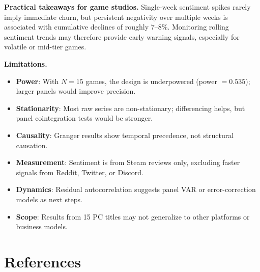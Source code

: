 \documentclass[11pt, letterpaper]{article}
\begin{document}
\medskip\noindent\textbf{Practical takeaways for game studios.}
Single-week sentiment spikes rarely imply immediate churn, but persistent negativity over multiple weeks is associated with cumulative declines of roughly 7--8\%.
Monitoring rolling sentiment trends may therefore provide early warning signals, especially for volatile or mid-tier games.

\medskip\noindent\textbf{Limitations.}
\begin{itemize}[nosep]
    \item \textbf{Power}: With $N = 15$ games, the design is underpowered (power $= 0.535$); larger panels would improve precision.
    \item \textbf{Stationarity}: Most raw series are non-stationary; differencing helps, but panel cointegration tests would be stronger.
    \item \textbf{Causality}: Granger results show temporal precedence, not structural causation.
    \item \textbf{Measurement}: Sentiment is from Steam reviews only, excluding faster signals from Reddit, Twitter, or Discord.
    \item \textbf{Dynamics}: Residual autocorrelation suggests panel VAR or error-correction models as next steps.
    \item \textbf{Scope}: Results from 15 PC titles may not generalize to other platforms or business models.
\end{itemize}

\section*{References}
\end{document}
